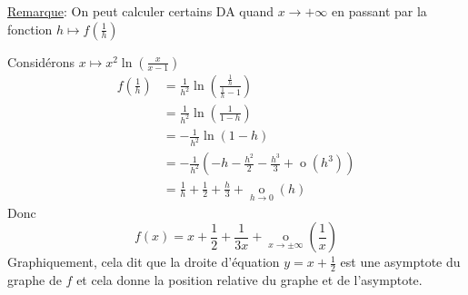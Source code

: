 \documentclass[10pt,a4paper]{article}
\theoremstyle{definition}
\DeclareMathOperator*{\negl}{o}
\begin{document}
\uline{Remarque}: On peut calculer certains DA quand $x \to +\infty$ en passant par la fonction $h \mapsto f(\frac{1}{h})$ \medskip

Considérons $x \mapsto x^2 \ln\left(\frac{x}{x - 1}\right)$
\begin{align*}
f\left(\frac{1}{h}\right) &= \frac{1}{h^2} \ln\left(\frac{\frac{1}{h}}{\frac{1}{h} - 1}\right) \\
&= \frac{1}{h^2} \ln\left(\frac{1}{1 - h}\right) \\
&= -\frac{1}{h^2} \ln(1 - h) \\
&= -\frac{1}{h^2} \left(-h -\frac{h^2}{2} - \frac{h^3}{3} + \negl(h^3)\right) \\
&= \frac{1}{h} + \frac{1}{2} + \frac{h}{3} + \negl\limits_{h \to 0}(h)
\end{align*}
Donc
\[f(x) = x + \frac{1}{2} + \frac{1}{3x} + \negl\limits_{x \to \pm\infty}\left(\frac{1}{x}\right)\]
Graphiquement, cela dit que la droite d'équation $y = x + \frac{1}{2}$ est une asymptote du graphe de $f$ et cela donne la position relative du graphe et de l'asymptote.
\end{document}

